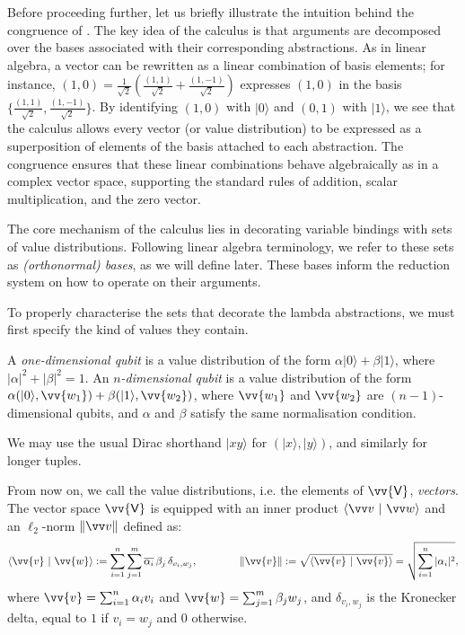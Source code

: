 \documentclass[runningheads,orivec,envcountsame,envcountsect]{llncs}
\newcommand\ket[1]{\ensuremath{|#1\rangle}}
\DeclareRobustCommand{\ValD}{\ensuremath{\vv{\mathsf{V}}}}
\def\scal#1#2{\langle{#1}~|~{#2}\rangle}
\def\Pair#1#2{(#1,#2)} %
\begin{document}
Before proceeding further, let us briefly illustrate the intuition behind
the congruence of .
The key idea of the calculus is that arguments are decomposed over the bases
associated with their corresponding abstractions.
As in linear algebra, a vector can be rewritten as a linear combination of
basis elements; for instance,
\(
  (1,0)
  = \tfrac{1}{\sqrt{2}}\!\left(\tfrac{(1,1)}{\sqrt{2}}
  + \tfrac{(1,-1)}{\sqrt{2}}\right)
\)
expresses $(1,0)$ in the basis
$\{\tfrac{(1,1)}{\sqrt{2}}, \tfrac{(1,-1)}{\sqrt{2}}\}$.
By identifying $(1,0)$ with $\ket{0}$ and $(0,1)$ with $\ket{1}$, we see
that the calculus allows every vector (or value distribution)
to be expressed as a superposition of elements of the basis attached to
each abstraction.
The congruence ensures that these linear combinations behave
algebraically as in a complex vector space, supporting the standard
rules of addition, scalar multiplication, and the zero vector.



The core mechanism of the calculus lies in decorating variable bindings with
sets of value distributions. Following linear algebra terminology, we refer to
these sets as \emph{(orthonormal) bases}, as we will define later. These bases
inform the reduction system on how to operate on their arguments.

To properly characterise the sets that decorate the lambda abstractions, we
must first specify the kind of values they contain.
\begin{definition}[Qubits]\label{def:Qubit}
  A \emph{one-dimensional qubit} is a value distribution of the form
  $\alpha\ket{0} + \beta\ket{1}$, where $|\alpha|^2 + |\beta|^2 = 1$. An
  \emph{$n$-dimensional qubit} is a value distribution of the form
  $\alpha\Pair{\ket{0}}{\vv{w_1}} + \beta\Pair{\ket{1}}{\vv{w_2}}$, where
  $\vv{w_1}$ and $\vv{w_2}$ are $(n-1)$-dimensional qubits, and $\alpha$ and
  $\beta$ satisfy the same normalisation condition.
\end{definition}
We may use the usual Dirac shorthand $\ket{xy}$ for $(\ket{x},\ket{y})$, and
similarly for longer tuples.

From now on, we call the value distributions, i.e. the elements of $\ValD$,
\emph{vectors}. The vector space $\ValD$ is equipped with an inner
product $\scal{\vv v}{\vv w}$ and an $\ell_2$-norm $\|\vv v\|$ defined as:
\[
  \scal{\vv{v}}{\vv{w}} := \sum_{i=1}^n\sum_{j=1}^m
  \overline{\alpha_i}\,\beta_j\,\delta_{v_i,w_j},
  \qquad\qquad
  \|\vv{v}\| := \sqrt{\scal{\vv{v}}{\vv{v}}}
  = \sqrt{\sum_{i=1}^n|\alpha_i|^2},
\]
where $\vv{v}=\sum_{i=1}^n\alpha_i v_i$ and
$\vv{w}=\sum_{j=1}^m\beta_j w_j$, and $\delta_{v_i,w_j}$ is the Kronecker
delta, equal to $1$ if $v_i=w_j$ and $0$ otherwise.
\end{document}
